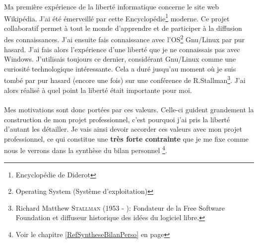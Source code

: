 \documentclass[a4paper,12pt, draft]{report}
\begin{document}
Ma première expérience de la liberté informatique concerne le site web Wikipédia. J'ai été émerveillé par cette Encyclopédie\footnote{Encyclopédie de Diderot} moderne.
Ce projet collaboratif permet à tout le monde d'apprendre et de participer à la diffusion des connaissances.
J'ai ensuite fais connaissance avec l'OS\footnote{Operating System (Système d'exploitation)} Gnu/Linux par pur hasard. J'ai fais alors l'expérience d'une liberté que je ne connaissais pas avec Windows. J'utilisais toujours ce dernier, considérant Gnu/Linux comme une curiosité technologique intéressante. 
Cela a duré jusqu'au moment où je suis tombé par pur hasard (encore une fois) sur une conférence de R.Stallman\footnote{Richard Matthew \textsc{Stallman} (1953 - ): Fondateur de la Free Software Foundation et diffuseur historique des idées du logiciel libre.}. J'ai alors réalisé à quel point la liberté était importante pour moi.


\paragraph{}
Mes motivations sont donc portées par ces valeurs. Celle-ci guident grandement la construction de mon projet professionnel, c'est pourquoi j'ai pris la liberté d'autant les détailler.
Je vais ainsi devoir accorder ces valeurs avec mon projet professionnel, ce qui constitue une \textbf{très forte contrainte} que je me fixe comme nous le verrons dans la synthèse du bilan personnel \footnote{Voir le chapitre \ref{RefSyntheseBilanPerso} en page \pageref{RefSyntheseBilanPerso}}.

\newpage
\end{document}
